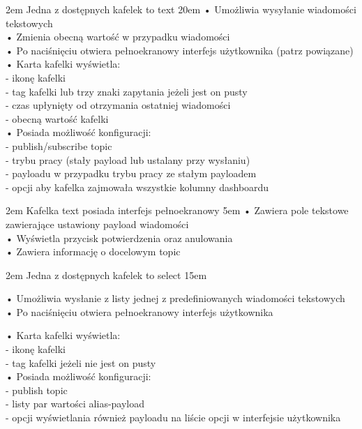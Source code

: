 {2em}{
    Jedna z dostępnych kafelek to text
}
{20em}{
    • Umożliwia wysyłanie wiadomości tekstowych\\
    • Zmienia obecną wartość w przypadku wiadomości\\
    • Po naciśnięciu otwiera pełnoekranowy interfejs użytkownika (patrz powiązane)\\

    • Karta kafelki wyświetla:\\
    - ikonę kafelki\\
    - tag kafelki lub trzy znaki zapytania jeżeli jest on pusty\\
    - czas upłynięty od otrzymania ostatniej wiadomości\\
    - obecną wartość kafelki\\

    • Posiada możliwość konfiguracji:\\
    - publish/subscribe topic\\
    - trybu pracy (stały payload lub ustalany przy wysłaniu)\\
    - payloadu w przypadku trybu pracy ze stałym payloadem\\
    - opcji aby kafelka zajmowała wszystkie kolumny dashboardu
}

{2em}{
    Kafelka text posiada interfejs pełnoekranowy}
{5em}{
    • Zawiera pole tekstowe zawierające ustawiony payload wiadomości\\
    • Wyświetla przycisk potwierdzenia oraz anulowania\\
    • Zawiera informację o docelowym topic
}

{2em}{
    Jedna z dostępnych kafelek to select
}
{15em}{
    • Umożliwia wysłanie z listy jednej z predefiniowanych wiadomości tekstowych\\
    • Po naciśnięciu otwiera pełnoekranowy interfejs użytkownika

    • Karta kafelki wyświetla:\\
    - ikonę kafelki\\
    - tag kafelki jeżeli nie jest on pusty\\

    • Posiada możliwość konfiguracji:\\
    - publish topic\\
    - listy par wartości alias-payload\\
    - opcji wyświetlania również payloadu na liście opcji w interfejsie użytkownika
}

